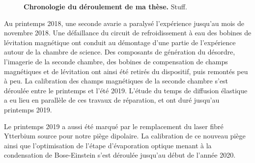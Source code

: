 \begin{figure}
\centering

\caption{\textbf{Chronologie du déroulement de ma thèse.} Stuff.}
\label{fig:chronologie_these}
\end{figure}

Au printemps 2018, une seconde avarie a paralysé l'expérience jusqu'au mois de novembre 2018. Une défaillance du circuit de refroidissement à eau des bobines de lévitation magnétique ont conduit au démontage d'une partie de l'expérience autour de la chambre de science. Des composants de génération du désordre, l'imagerie de la seconde chambre, des bobines de compensation de champs magnétiques et de lévitation ont ainsi été retirés du dispositif, puis remontés peu à peu. La calibration des champs magnétiques de la seconde chambre s'est déroulée entre le printemps et l'été 2019. L'étude du temps de diffusion élastique a eu lieu en parallèle de ces travaux de réparation, et ont duré jusqu'au printemps 2019.

Le printemps 2019 a aussi été marqué par le remplacement du laser fibré Ytterbium source pour notre piège dipolaire. La calibration de ce nouveau piège ainsi que l'optimisation de l'étape d'évaporation optique menant à la condensation de Bose-Einstein s'est déroulée jusqu'au début de l'année 2020. 





